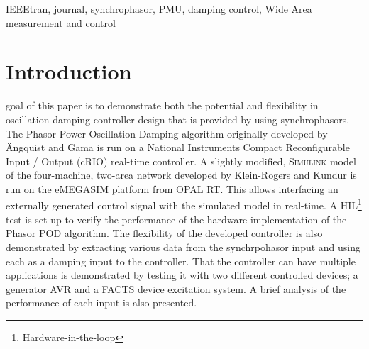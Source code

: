 \documentclass[journal]{IEEEtran}
\begin{document}
\begin{IEEEkeywords}
IEEEtran, journal, synchrophasor, PMU, damping control, Wide Area measurement and control
\end{IEEEkeywords}






%
\IEEEpeerreviewmaketitle



\section{Introduction}
% 
% 
% 
% 
 goal of this paper is to demonstrate both the potential and flexibility in oscillation damping controller design that is provided by using synchrophasors. The Phasor Power Oscillation Damping algorithm originally developed by \"{A}ngquist and Gama\cite{PhasorPOD} is run on a National Instruments Compact Reconfigurable Input / Output (cRIO) real-time controller. A slightly modified, \textsc{Simulink} model of the four-machine, two-area network developed by Klein-Rogers and Kundur \cite{KundurTwoArea} is run on the eMEGASIM \cite{eMEGASIM} platform from OPAL RT. This allows interfacing an externally generated control signal with the simulated model in real-time. A HIL\footnote{Hardware-in-the-loop} test is set up to verify the performance of the hardware implementation of the Phasor POD algorithm. The flexibility of the developed controller is also demonstrated by extracting various data from the synchrpohasor input and using each as a damping input to the controller. That the controller can have multiple applications is demonstrated by testing it with two different controlled devices; a generator AVR and a FACTS device excitation system. A brief analysis of the performance of each input is also presented.\\
\end{document}
